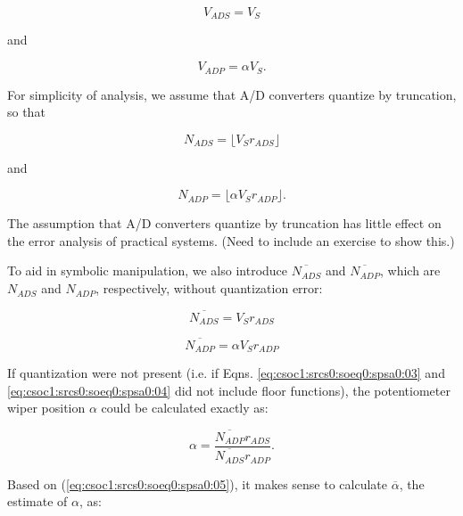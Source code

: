 \begin{equation}
\label{eq:csoc1:srcs0:soeq0:spsa0:01}
V_{ADS}  =  V_S
\end{equation}

\noindent{}and

\begin{equation}
\label{eq:csoc1:srcs0:soeq0:spsa0:02}
V_{ADP}  =  \alpha V_S.
\end{equation}

For simplicity of analysis, we assume that A/D converters quantize by
truncation, so that

\begin{equation}
\label{eq:csoc1:srcs0:soeq0:spsa0:03}
N_{ADS}  =  \lfloor V_S r_{ADS} \rfloor
\end{equation}

\noindent{}and

\begin{equation}
\label{eq:csoc1:srcs0:soeq0:spsa0:04}
N_{ADP}  =  \lfloor \alpha V_S r_{ADP} \rfloor.
\end{equation}

\noindent{}The assumption that A/D converters quantize by truncation
has little effect on the error analysis of practical systems.  (Need
to include an exercise to show this.)

To aid in symbolic manipulation, we also introduce
$\overline{N_{ADS}}$ and $\overline{N_{ADP}}$, which are
$N_{ADS}$ and $N_{ADP}$, respectively,
without quantization error:

\begin{equation}
\label{eq:csoc1:srcs0:soeq0:spsa0:03b}
\overline{N_{ADS}}  =  V_S r_{ADS}
\end{equation}

\begin{equation}
\label{eq:csoc1:srcs0:soeq0:spsa0:04b}
\overline{N_{ADP}}  =  \alpha V_S r_{ADP}
\end{equation}

If quantization were not present (i.e. if Eqns. 
\ref{eq:csoc1:srcs0:soeq0:spsa0:03}
and 
\ref{eq:csoc1:srcs0:soeq0:spsa0:04}
did not include floor functions), the potentiometer wiper position
$\alpha$ could be calculated exactly as:

\begin{equation}
\label{eq:csoc1:srcs0:soeq0:spsa0:05}
\alpha = \frac{\overline{N_{ADP}} r_{ADS}}{\overline{N_{ADS}} r_{ADP}}.
\end{equation}

Based on (\ref{eq:csoc1:srcs0:soeq0:spsa0:05}),
it makes sense to calculate $\overline{\alpha}$, the
estimate of $\alpha$, as:

